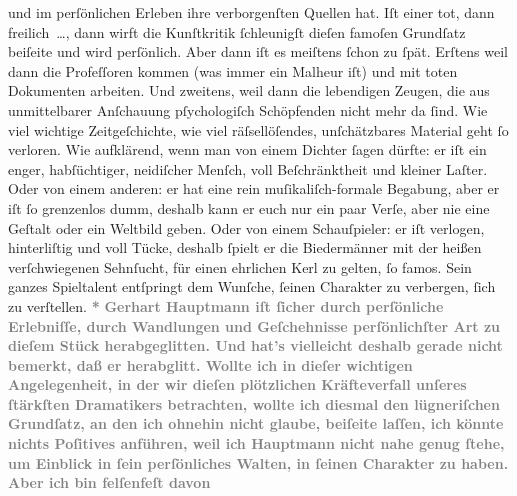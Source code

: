 \begin{ledgroupsized}[t]{13cm}
{{                  und im perſönlichen Erleben ihre verborgenſten Quellen hat. Iſt einer tot, dann
                     freilich {\dots}, dann wirft die Kunſtkritik ſchleunigſt
                  dieſen famoſen Grundſatz beiſeite und wird perſönlich. Aber dann iſt es meiſtens
                  ſchon zu ſpät. Erſtens weil dann die Profeſſoren kommen (was immer ein Malheur
                  iſt) und mit toten Dokumenten arbeiten. Und zweitens, weil dann die lebendigen
                  Zeugen, die aus unmittelbarer Anſchauung pſychologiſch Schöpfenden nicht mehr da
                  ſind. Wie viel wichtige Zeitgeſchichte, wie viel räſsellöſendes, unſchätzbares
                  Material geht ſo verloren. Wie aufklärend, wenn man von einem Dichter ſagen
                  dürfte: er iſt ein enger, habſüchtiger, neidiſcher Menſch, voll Beſchränktheit und
                  kleiner Laſter. Oder von einem anderen: er hat eine rein muſikaliſch-formale
                  Begabung, aber er iſt ſo grenzenlos dumm, deshalb kann er euch nur ein paar Verſe,
                  aber nie eine Geſtalt oder ein Weltbild geben. Oder von einem Schauſpieler: er iſt
                  verlogen, hinterliſtig und voll Tücke, deshalb ſpielt er die Biedermänner mit der
                  heißen verſchwiegenen Sehnſucht, für einen ehrlichen Kerl zu gelten, ſo famos.
                  Sein ganzes Spieltalent entſpringt dem Wunſche, ſeinen Charakter zu verbergen,
                  ſich zu verſtellen.}}\pend
           \pstart
           \centering{}\textcolor{gray}{\textbf{*}}\pend
           \pstart
           \noindent{}\textcolor{gray}{\textbf{Gerhart Hauptmann iſt ſicher durch
                  perſönliche Erlebniſſe, durch Wandlungen und Geſchehnisse perſönlichſter Art zu
                  dieſem Stück herabgeglitten. Und hat’s vielleicht deshalb gerade nicht bemerkt,
                  daß er herabglitt. Wollte ich in dieſer wichtigen Angelegenheit, in der wir dieſen
                  plötzlichen Kräfteverfall unſeres ſtärkſten Dramatikers betrachten, wollte ich
                  diesmal den lügneriſchen Grundſatz, an den ich ohnehin nicht glaube, beiſeite
                  laſſen, ich könnte nichts Poſitives anführen, weil ich Hauptmann nicht nahe genug ſtehe, um Einblick in ſein
                  perſönliches Walten, in ſeinen Charakter zu haben. Aber ich bin felſenfeſt davon
}}
\end{ledgroupsized}
